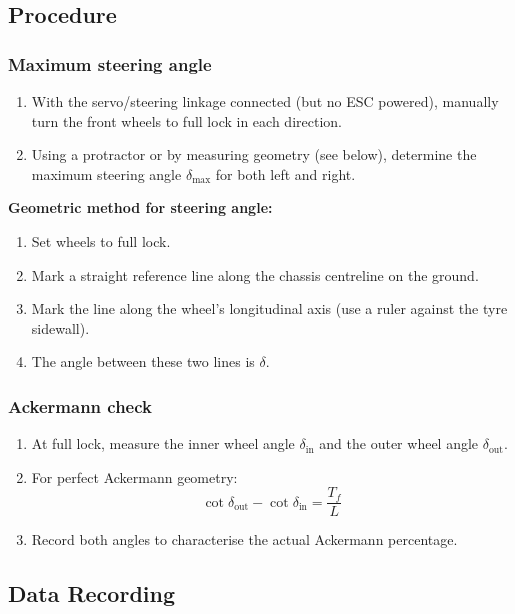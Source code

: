 \documentclass[a4paper,11pt]{article}
\begin{document}
\subsection{Procedure}

\subsubsection{Maximum steering angle}
\begin{enumerate}
  \item With the servo/steering linkage connected (but no ESC powered),
        manually turn the front wheels to full lock in each direction.
  \item Using a protractor or by measuring geometry (see below),
        determine the maximum steering angle $\delta_\text{max}$ for
        both left and right.
\end{enumerate}

\noindent\textbf{Geometric method for steering angle:}
\begin{enumerate}
  \item Set wheels to full lock.
  \item Mark a straight reference line along the chassis centreline on
        the ground.
  \item Mark the line along the wheel's longitudinal axis (use a ruler
        against the tyre sidewall).
  \item The angle between these two lines is $\delta$.
\end{enumerate}

\subsubsection{Ackermann check}
\begin{enumerate}
  \item At full lock, measure the inner wheel angle $\delta_\text{in}$
        and the outer wheel angle $\delta_\text{out}$.
  \item For perfect Ackermann geometry:
        \begin{equation}
          \cot\delta_\text{out} - \cot\delta_\text{in}
          = \frac{T_f}{L}
        \end{equation}
  \item Record both angles to characterise the actual Ackermann
        percentage.
\end{enumerate}

\subsection{Data Recording}
\end{document}
